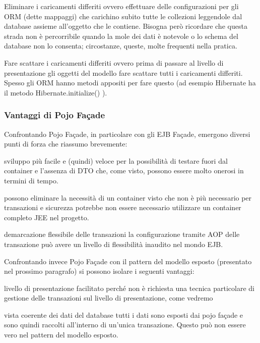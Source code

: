 \begin{description*}
  \item [Eliminare i caricamenti differiti] ovvero effettuare delle configurazioni per gli ORM (dette mappaggi) che carichino subito tutte le collezioni leggendole dal database assieme all'oggetto che le contiene. Bisogna però ricordare che  questa strada non è percorribile quando la mole dei dati è notevole o lo schema del database non lo consenta; circostanze, queste, molte frequenti nella pratica.
  \item[Fare scattare i caricamenti differiti] ovvero prima di passare al livello di presentazione gli oggetti del modello fare scattare tutti i caricamenti differiti. Spesso gli ORM hanno metodi appositi per fare questo (ad esempio Hibernate ha il metodo Hibernate.initialize() ).
\end{description*}

\subsubsection{Vantaggi di Pojo Façade}
Confrontando Pojo Façade, in particolare con gli EJB Façade, emergono diversi punti di forza che riassumo brevemente:
\begin{description*}
  \item[sviluppo più facile e (quindi) veloce] per la possibilità di testare fuori dal container e l'assenza di DTO che, come visto, possono essere molto onerosi in termini di tempo.
  \item[possono eliminare la necessità di un container] visto che non è più necessario per transazioni e sicurezza potrebbe non essere necessario utilizzare un container completo JEE nel progetto.
 \item[demarcazione flessibile delle transazioni] la configurazione tramite AOP delle transazione può avere un livello di flessibilità inaudito nel mondo EJB.
\end{description*}

Confrontando invece Pojo Façade con il pattern del modello esposto (presentato nel prossimo paragrafo) si possono isolare i seguenti vantaggi:

\begin{description*}
  \item[livello di presentazione facilitato] perché non è richiesta una tecnica particolare di gestione delle transazioni sul livello di presentazione, come vedremo
 \item[vista coerente dei dati del database] tutti i dati sono esposti dai pojo façade e sono quindi raccolti all'interno di un'unica transazione. Questo può non essere vero nel pattern del modello esposto.
\end{description*}

